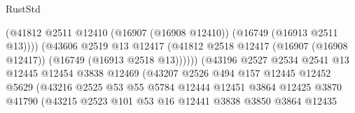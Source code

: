 \begin{lexlean}{RustStd}
\begin{coremodule}
                                            (@41812
                                              @2511
                                              @12410
                                              (@16907 (@16908 @12410))
                                              (@16749 (@16913 @2511 @13))))
                                          (@43606
                                            @2519
                                            @13
                                            @12417
                                            (@41812
                                              @2518
                                              @12417
                                              (@16907 (@16908 @12417))
                                              (@16749 (@16913 @2518 @13))))))
                                      (@43196
                                        @2527
                                        @2534
                                        @2541
                                        @13
                                        @12445
                                        @12454
                                        @3838
                                        @12469
                                        (@43207
                                          @2526
                                          @494
                                          @157
                                          @12445
                                          @12452
                                          @5629
                                          (@43216
                                            @2525
                                            @53
                                            @55
                                            @5784
                                            @12444
                                            @12451
                                            @3864
                                            @12425
                                            @3870
                                            @41790
                                            (@43215
                                              @2523
                                              @101
                                              @53
                                              @16
                                              @12441
                                              @3838
                                              @3850
                                              @3864
                                              @12435

\end{coremodule}
\end{lexlean}
